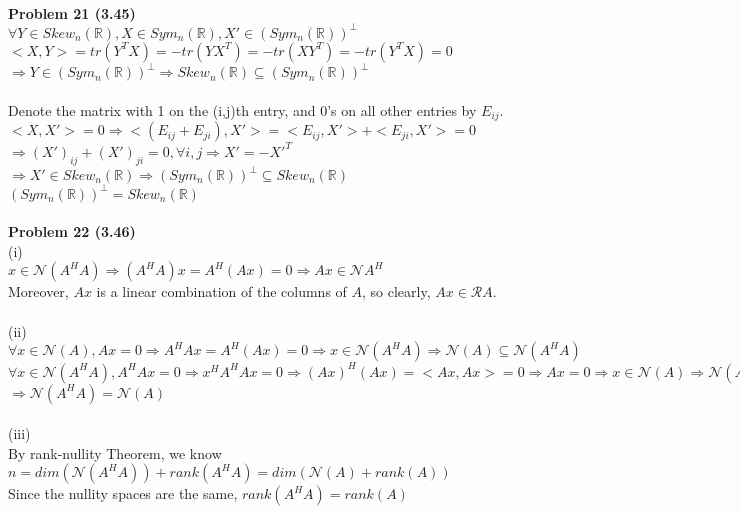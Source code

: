 \documentclass[letterpaper,12pt]{article}
\theoremstyle{definition}
\begin{document}
\\
\noindent\textbf{Problem 21 (3.45)}\\
$\forall Y\in Skew_n(\mathbb{R}), X\in Sym_n(\mathbb{R}), X'\in (Sym_n(\mathbb{R}))^{\bot}$\\
$<X, Y> = tr(Y^TX) = -tr(YX^T) = -tr(XY^T) = -tr(Y^TX) = 0$\\
$\Rightarrow Y\in (Sym_n(\mathbb{R}))^{\bot}\Rightarrow Skew_n(\mathbb{R})\subseteq (Sym_n(\mathbb{R}))^{\bot}$\\
\\
Denote the matrix with 1 on the (i,j)th entry, and 0's on all other entries by $E_{ij}$.\\
$<X, X'> = 0\Rightarrow <(E_{ij} + E_{ji}), X'> = <E_{ij}, X'> + <E_{ji}, X'> = 0$\\
$\Rightarrow (X')_{ij}+(X')_{ji} = 0, \forall i,j\Rightarrow X' = -X'^T$\\
$\Rightarrow X'\in Skew_n(\mathbb{R}) \Rightarrow (Sym_n(\mathbb{R}))^{\bot}\subseteq Skew_n(\mathbb{R})$\\
$(Sym_n(\mathbb{R}))^{\bot} = Skew_n(\mathbb{R})$\\
\\
\noindent\textbf{Problem 22 (3.46)}\\
(i)\\
$x\in \mathscr{N}(A^HA)\Rightarrow (A^HA)x = A^H(Ax) = 0\Rightarrow Ax\in \mathscr{N}A^H$\\
Moreover, $Ax$ is a linear combination of the columns of $A$, so clearly, $Ax\in \mathscr{R}A$.\\
\\
(ii)\\
$\forall x\in \mathscr{N}(A), Ax=0\Rightarrow A^HAx = A^H(Ax) = 0\Rightarrow x\in \mathscr{N}(A^HA)\Rightarrow \mathscr{N}(A)\subseteq \mathscr{N}(A^HA)$\\
$\forall x\in \mathscr{N}(A^HA), A^HAx = 0\Rightarrow x^HA^HAx = 0\Rightarrow (Ax)^H(Ax) = <Ax, Ax> = 0\Rightarrow Ax=0\Rightarrow x\in \mathscr{N}(A)\Rightarrow \mathscr{N}(A^HA)\subseteq \mathscr{N}(A)$\\
$\Rightarrow \mathscr{N}(A^HA) = \mathscr{N}(A)$\\
\\
(iii)\\
By rank-nullity Theorem, we know $n=dim(\mathscr{N}(A^HA))+rank(A^HA) = dim(\mathscr{N}(A)+rank(A))$\\
Since the nullity spaces are the same, $rank(A^HA) = rank(A)$\\
\\
\end{document}
